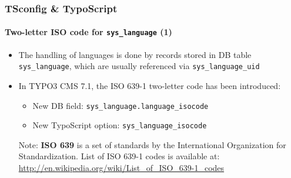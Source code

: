 
\begin{frame}[fragile]
	\frametitle{TSconfig \& TypoScript}
	\framesubtitle{Two-letter ISO code for \texttt{sys\_language} (1)}

	\begin{itemize}
		\item The handling of languages is done by records stored in DB table
			\texttt{sys\_language}, which are usually referenced via \texttt{sys\_language\_uid}
		\item In TYPO3 CMS 7.1, the ISO 639-1 two-letter code has been introduced:

			\begin{itemize}
				\item New DB field: \texttt{sys\_language.language\_isocode}
				\item New TypoScript option: \texttt{sys\_language\_isocode}
			\end{itemize}


		\vspace{1cm}

		\small
			Note: \textbf{ISO 639} is a set of standards by the International Organization
			for Standardization. List of ISO 639-1 codes is available at:\newline
			\url{http://en.wikipedia.org/wiki/List_of_ISO_639-1_codes}
		\normalsize

	\end{itemize}

\end{frame}


